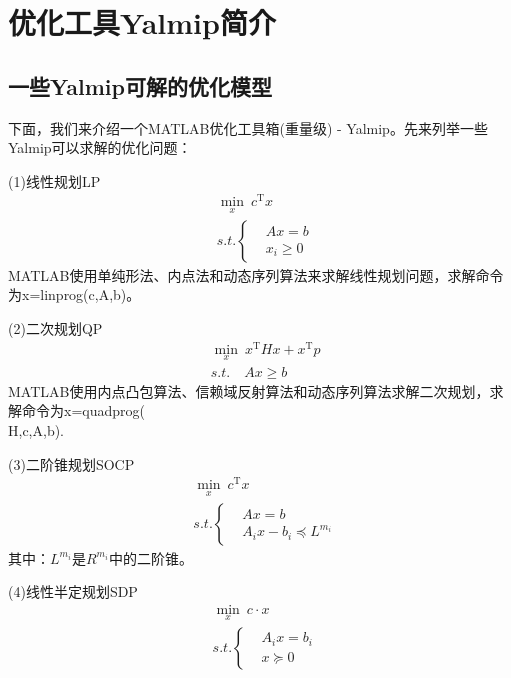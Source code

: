 
\chapter{优化工具Yalmip简介}
\section{一些Yalmip可解的优化模型}
    \par
    下面，我们来介绍一个MATLAB优化工具箱(重量级) - Yalmip。先来列举一些Yalmip可以求解的优化问题：
    \par
    (1)线性规划LP
    \begin{align*}
    &\min_x \ c^\mathrm{T}x\\
    &s.t.\left\{
    \begin{aligned}
    &Ax = b\\
    &x_i \geqslant 0
    \end{aligned}
    \right.
    \end{align*}
    MATLAB使用单纯形法、内点法和动态序列算法来求解线性规划问题，求解命令为x=linprog(c,A,b)。
    \par
    (2)二次规划QP
    \begin{align*}
    &\min_x \ x^\mathrm{T} Hx + x^\mathrm{T}p\\
    &s.t.\quad Ax \geqslant b
    \end{align*}
    MATLAB使用内点凸包算法、信赖域反射算法和动态序列算法求解二次规划，求解命令为x=quadprog(\\H,c,A,b).
    \par
    (3)二阶锥规划SOCP
    \begin{align*}
    &\min_x \ c^\mathrm{T}x\\
    &s.t.\left\{
    \begin{aligned}
    &Ax = b\\
    &A_ix - b_i \preceq L^{m_i}
    \end{aligned}
    \right.
    \end{align*}
    其中：$L^{m_i}$是$R^{m_i}$中的二阶锥。
    \par
    (4)线性半定规划SDP
    \begin{align*}
    &\min_x \ c \cdot x\\
    &s.t.\left\{
    \begin{aligned}
    &A_ix = b_i\\
    &x \succeq 0
    \end{aligned}
    \right.
    \end{align*}
